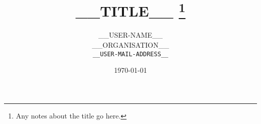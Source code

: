 \documentclass[11pt,twoside,a4paper,notitlepage]{article}
\numberwithin{equation}{section}
\begin{document}
%
%

\title{__TITLE__%
  \thanks{Any notes about the title go here.}}

\author{%
  __USER-NAME__ \\
  __ORGANISATION__\\
  \texttt{__USER-MAIL-ADDRESS__}
}

\date{\today}

\maketitle

%
%

\thispagestyle{empty}

%


\pagestyle{fancy}
\fancyhead{}
\fancyfoot{}
\renewcommand{\headrulewidth}{0pt}
\renewcommand{\footrulewidth}{0pt}

%
%
\fancyhead[CO]{\slshape \nouppercase{\leftmark}}
\fancyfoot[C]{\thepage}

\setlength{\headheight}{13.6pt}

%
%











%
%




\end{document}
